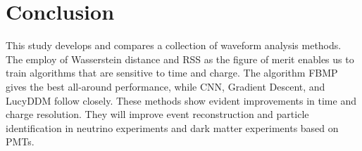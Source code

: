 \section{Conclusion}
\label{sec:conclusion}

This study develops and compares a collection of waveform analysis methods. The employ of Wasserstein distance and RSS as the figure of merit enables us to train algorithms that are sensitive to time and charge. The algorithm FBMP gives the best all-around performance, while CNN, Gradient Descent, and LucyDDM follow closely. These methods show evident improvements in time and charge resolution. They will improve event reconstruction and particle identification in neutrino experiments and dark matter experiments based on PMTs. 